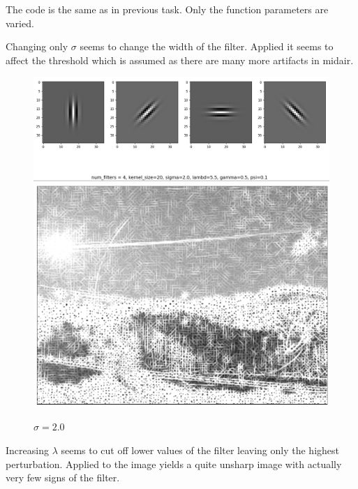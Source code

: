 \documentclass[UTF-8]{article}
\begin{document}
The code is the same as in previous task. Only the function parameters are varied.

Changing only $\sigma$ seems to change the width of the filter. Applied it seems to affect the threshold which is assumed as there are many more artifacts in midair.

\begin{figure}[H]
	\centering
	\includegraphics[width=0.7\linewidth]{task4_1}
	\includegraphics[width=0.7\linewidth]{task4_2}
	\caption{$\sigma = 2.0$}
	\label{fig:task41}
\end{figure}
\newpage

Increasing $\lambda$ seems to cut off lower values of the filter leaving only the highest perturbation. Applied to the image yields a quite unsharp image with actually very few signs of the filter.
\end{document}
